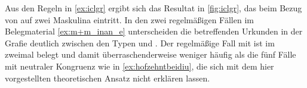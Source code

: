 











Aus den Regeln in \cref{ex:iclgr} ergibt sich das Resultat in \cref{fig:iclgr},
das beim Bezug von  auf zwei Maskulina eintritt. In den zwei
regelmäßigen Fällen im Belegmaterial \cref{ex:m+m_inan_e} unterscheiden die
betreffenden Urkunden in der Grafie deutlich zwischen den Typen  und
. Der regelmäßige Fall mit  ist im \CAO{} zweimal
belegt und damit über\-raschender\-weise weniger häufig als die fünf Fälle mit
neutraler Kongruenz wie in \cref{ex:hofzehntbeidiu}, die sich mit dem hier
vorgestellten theoretischen Ansatz nicht erklären lassen.

